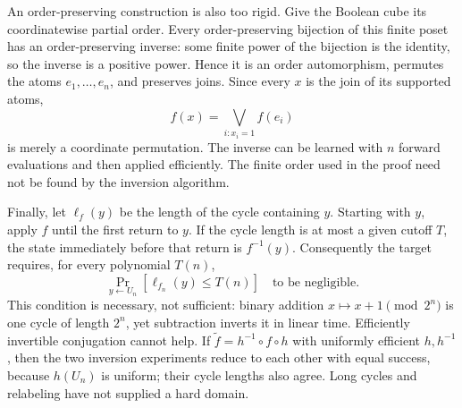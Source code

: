 \documentclass[11pt,a4paper]{article}
\numberwithin{equation}{section}
\begin{document}
An order-preserving construction is also too rigid. Give the Boolean
cube its coordinatewise partial order. Every order-preserving bijection
of this finite poset has an order-preserving inverse: some finite power
of the bijection is the identity, so the inverse is a positive power.
Hence it is an order automorphism, permutes the atoms $e_1,\ldots,e_n$,
and preserves joins. Since every $x$ is the join of its supported atoms,
\[
 f(x)=\bigvee_{i:x_i=1}f(e_i)
\]
is merely a coordinate permutation. The inverse can be learned with
$n$ forward evaluations and then applied efficiently. The finite order
used in the proof need not be found by the inversion algorithm.

Finally, let $\ell_f(y)$ be the length of the cycle containing $y$.
Starting with $y$, apply $f$ until the first return to $y$. If the cycle
length is at most a given cutoff $T$, the state immediately before that
return is $f^{-1}(y)$. Consequently the target requires, for every
polynomial $T(n)$,
\begin{equation}\label{eq:30006696:cycles}
 \Pr_{y\leftarrow U_n}[\ell_{f_n}(y)\le T(n)]
        \quad\text{to be negligible.}
\end{equation}
This condition is necessary, not sufficient: binary addition
$x\mapsto x+1\pmod{2^n}$ is one cycle of length $2^n$, yet subtraction
inverts it in linear time. Efficiently invertible conjugation cannot
help. If $\widetilde f=h^{-1}\circ f\circ h$ with uniformly efficient
$h,h^{-1}$, then the two inversion experiments reduce to each other
with equal success, because $h(U_n)$ is uniform; their cycle lengths
also agree. Long cycles and relabeling have not supplied a hard domain.
\end{document}
